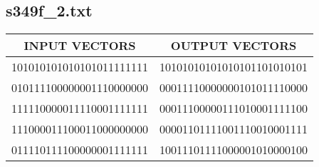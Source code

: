 \documentclass[paper=a4, fontsize=12pt]{scrartcl} %
\numberwithin{equation}{section} %
\numberwithin{figure}{section} %
\numberwithin{table}{section} %
\begin{document}
\subsection{s349f\_2.txt}
\begin{center}
\begin{tabular}{| c | c | }
\hline INPUT VECTORS & OUTPUT VECTORS \\ \hline
101010101010101011111111 & 10101010101010101101010101 \\ \hline
010111100000001110000000 & 00011110000000101011110000 \\  \hline
111110000011110001111111 & 00011100000111010001111100 \\ \hline
111000011100011000000000 & 00001101111001110010001111 \\ \hline
011110111100000001111111 & 10011101111000001010000100 \\ \hline

\end{tabular}
\end{center}
\newpage
\end{document}
